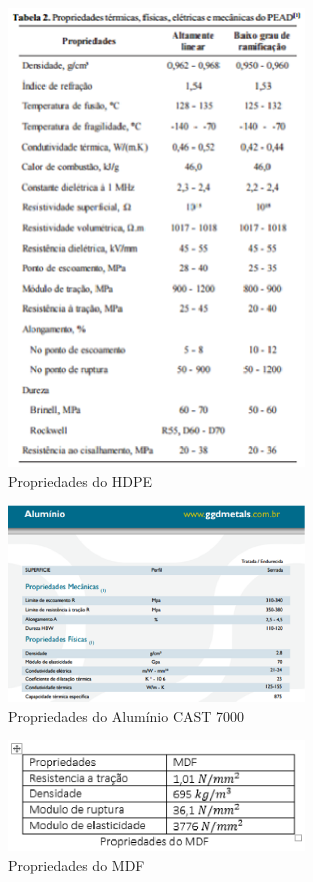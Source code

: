 \begin{figure}[H]
    \centering
    \includegraphics[width=0.7\textwidth]{figuras/pp_HDPE.eps}
    \caption{Propriedades do HDPE}
    \label{fig:pp_HDPE}
\end{figure}

\begin{figure}[H]
    \centering
    \includegraphics[width=0.7\textwidth]{figuras/pp_aluminio.eps}
    \caption{Propriedades do Alumínio CAST 7000}
    \label{fig:pp_aluminio}
\end{figure}


\begin{figure}[H]
    \centering
    \includegraphics[width=0.7\textwidth]{figuras/pp_MDF.eps}
    \caption{Propriedades do MDF}
    \label{fig:pp_MDF}
\end{figure}


